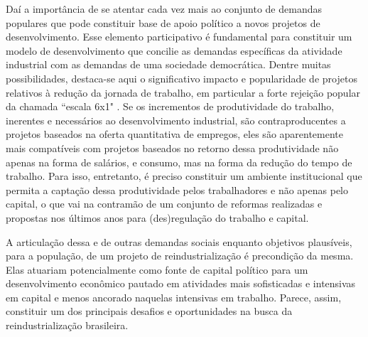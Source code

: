 Daí a importância de se atentar cada vez mais ao conjunto de demandas
populares que pode constituir base de apoio político a novos projetos de
desenvolvimento. Esse elemento participativo é fundamental para
constituir um modelo de desenvolvimento que concilie as demandas
específicas da atividade industrial com as demandas de uma sociedade
democrática. Dentre muitas possibilidades, destaca-se aqui o
significativo impacto e popularidade de projetos relativos à redução da
jornada de trabalho, em particular a forte rejeição popular da chamada
``escala 6x1" . Se os incrementos de produtividade do
trabalho, inerentes e necessários ao desenvolvimento industrial, são
contraproducentes a projetos baseados na oferta quantitativa de
empregos, eles são aparentemente mais compatíveis com projetos baseados
no retorno dessa produtividade não apenas na forma de salários, e
consumo, mas na forma da redução do tempo de trabalho. Para isso,
entretanto, é preciso constituir um ambiente institucional que permita a
captação dessa produtividade pelos trabalhadores e não apenas pelo
capital, o que vai na contramão de um conjunto de reformas realizadas e
propostas nos últimos anos para (des)regulação do trabalho e capital.

A articulação dessa e de outras demandas sociais enquanto objetivos
plausíveis, para a população, de um projeto de reindustrialização é
precondição da mesma. Elas atuariam potencialmente como fonte de capital
político para um desenvolvimento econômico pautado em atividades mais
sofisticadas e intensivas em capital e menos ancorado naquelas
intensivas em trabalho. Parece, assim, constituir um dos principais
desafios e oportunidades na busca da reindustrialização brasileira.

